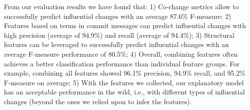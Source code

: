 

From our evaluation results we have found that: 1) Co-change metrics allow
to successfully predict influential changes with an average 87.6\% F-measure;
2) Features based on terms in commit messages can predict influential changes
with high precision (average of 94.9\%) and recall (average of 94.4\%); 3)
Structural features can be leveraged to successfully predict influential
changes with an average F-measure performance of 80.5\%; 4) Overall, combining
features often achieves a better classification performance than individual
feature groups. For example, combining all features showed 96.1\% precision,
94.9\% recall, and 95.2\% F-measure on average; 5) With the features we
collected, our explanatory model has an acceptable performance in the wild, i.e.,
with different types of influential changes (beyond the ones we relied upon to infer
the features).
